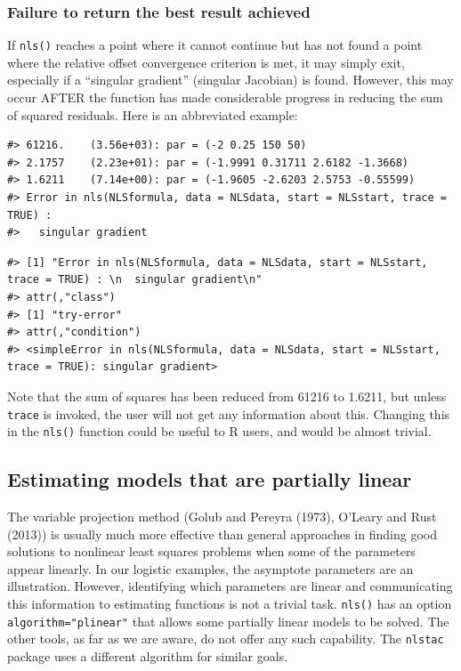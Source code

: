 \subsubsection{Failure to return the best result achieved}\label{failure-to-return-the-best-result-achieved}

If \texttt{nls()} reaches a point where it cannot continue but has not found a point
where the relative offset convergence criterion is met, it may simply exit,
especially if a ``singular gradient'' (singular Jacobian) is found. However,
this may occur AFTER the function has made considerable progress in reducing
the sum of squared residuals.
Here is an abbreviated example:

\begin{verbatim}
#> 61216.    (3.56e+03): par = (-2 0.25 150 50)
#> 2.1757    (2.23e+01): par = (-1.9991 0.31711 2.6182 -1.3668)
#> 1.6211    (7.14e+00): par = (-1.9605 -2.6203 2.5753 -0.55599)
#> Error in nls(NLSformula, data = NLSdata, start = NLSstart, trace = TRUE) : 
#>   singular gradient
\end{verbatim}

\begin{verbatim}
#> [1] "Error in nls(NLSformula, data = NLSdata, start = NLSstart, trace = TRUE) : \n  singular gradient\n"
#> attr(,"class")
#> [1] "try-error"
#> attr(,"condition")
#> <simpleError in nls(NLSformula, data = NLSdata, start = NLSstart, trace = TRUE): singular gradient>
\end{verbatim}

Note that the sum of squares has been reduced from 61216 to 1.6211, but
unless \texttt{trace} is invoked, the user will not get any information about this.
Changing this in the \texttt{nls()} function could be useful to R users, and would
be almost trivial.

\subsection{Estimating models that are partially linear}\label{estimating-models-that-are-partially-linear}

The variable projection method (Golub and Pereyra (1973), O'Leary and Rust (2013)) is
usually much more effective than general approaches in finding good solutions
to nonlinear least squares
problems when some of the parameters appear linearly. In our logistic examples,
the asymptote parameters are an illustration. However, identifying which parameters
are linear and communicating this information to estimating functions
is not a trivial task. \texttt{nls()} has an option \texttt{algorithm="plinear"} that allows some partially linear
models to be solved. The other tools, as far as we are aware, do not offer any
such capability. The \texttt{nlstac} package uses a different algorithm for similar goals.

